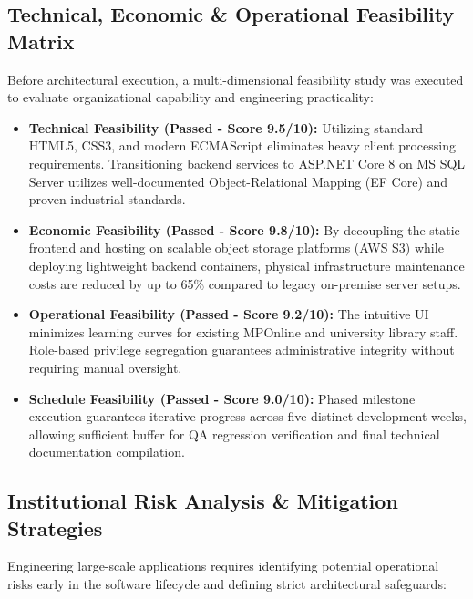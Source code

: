 \documentclass[10pt,journal,compsoc]{IEEEtran}
\begin{document}
\subsection{Technical, Economic \& Operational Feasibility Matrix}
Before architectural execution, a multi-dimensional feasibility study was executed to evaluate organizational capability and engineering practicality:

\begin{itemize}[leftmargin=1.5em]
    \item \textbf{Technical Feasibility (Passed - Score 9.5/10):} Utilizing standard HTML5, CSS3, and modern ECMAScript eliminates heavy client processing requirements. Transitioning backend services to ASP.NET Core 8 on MS SQL Server utilizes well-documented Object-Relational Mapping (EF Core) and proven industrial standards.
    \item \textbf{Economic Feasibility (Passed - Score 9.8/10):} By decoupling the static frontend and hosting on scalable object storage platforms (AWS S3) while deploying lightweight backend containers, physical infrastructure maintenance costs are reduced by up to 65\% compared to legacy on-premise server setups.
    \item \textbf{Operational Feasibility (Passed - Score 9.2/10):} The intuitive UI minimizes learning curves for existing MPOnline and university library staff. Role-based privilege segregation guarantees administrative integrity without requiring manual oversight.
    \item \textbf{Schedule Feasibility (Passed - Score 9.0/10):} Phased milestone execution guarantees iterative progress across five distinct development weeks, allowing sufficient buffer for QA regression verification and final technical documentation compilation.
\end{itemize}

\subsection{Institutional Risk Analysis \& Mitigation Strategies}
Engineering large-scale applications requires identifying potential operational risks early in the software lifecycle and defining strict architectural safeguards:
\end{document}
